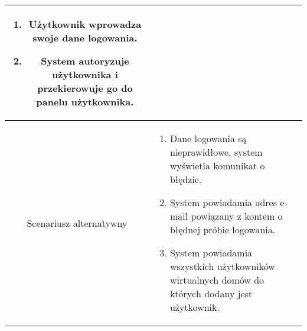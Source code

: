\documentclass{article}
\begin{document}
\begin{enumerate}
\begin{enumerate}
\begin{table}[H]
\begin{tabular}{|c|p{7cm}|}
\begin{enumerate}
\item Użytkownik wprowadza swoje dane logowania.

\item System autoryzuje użytkownika i przekierowuje go do panelu użytkownika.\end{enumerate}                                                                                             \\
						\hline
						Scenariusz alternatywny & \begin{enumerate}\item Dane logowania są nieprawidłowe, system wyświetla komunikat o błędzie.

\item System powiadamia adres e-mail powiązany z kontem o błędnej próbie logowania.

\item System powiadamia wszystkich użytkowników wirtualnych domów do których dodany jest użytkownik.\end{enumerate} \\
						\hline
					\end{tabular}
				\end{table}


\end{enumerate}
\end{enumerate}
\end{document}
